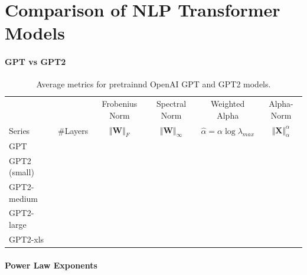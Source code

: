 \section{Comparison of NLP Transformer Models}
\label{sxn:nlp}

\paragraph{GPT vs GPT2}

\begin{table}[t]
\small
\begin{center}
\begin{tabular}{|p{1in}|c|c|c|c|c|}
\hline
   &    & Frobenius Norm & Spectral Norm & Weighted Alpha & Alpha-Norm \\
 Series & \#Layers   & $\Vert\mathbf{W}\Vert_{F}$ & $\Vert\mathbf{W}\Vert_{\infty}$ & $\hat{\alpha}=\alpha\log\lambda_{max}$ & $\Vert\mathbf{X}\Vert^{\alpha}_{\alpha}$ \\
\hline
 GPT & & & & \\
 GPT2 (small) & & & & \\
 GPT2-medium & & & & \\
 GPT2-large & & & & \\
 GPT2-xls & & & & \\

\hline
\end{tabular}
\end{center}
\caption{Average metrics for pretrainnd OpenAI GPT and GPT2 models.}
\label{table:models}
\end{table}


\paragraph{Power Law Exponents}

